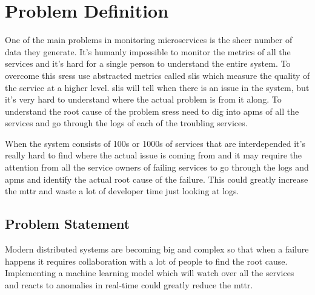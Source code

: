 {\let\clearpage\relax \chapter{Problem Definition}}

One of the main problems in monitoring microservices is the sheer number of data they generate. It's humanly impossible to monitor the metrics of all the services and it's hard for a single person to understand the entire system. To overcome this \acp{sres} use abstracted metrics called \acp{sli} which measure the quality of the service at a higher level. \acp{sli} will tell when there is an issue in the system, but it's very hard to understand where the actual problem is from it along. To understand the root cause of the problem \acp{sres} need to dig into \acp{apm} of all the services and go through the logs of each of the troubling services.

When the system consists of 100s or 1000s of services that are interdepended it's really hard to find where the actual issue is coming from and it may require the attention from all the service owners of failing services to go through the logs and \acp{apm} and identify the actual root cause of the failure.
This could greatly increase the \ac{mttr} and waste a lot of developer time just looking at logs.

\section{Problem Statement}

Modern distributed systems are becoming big and complex so that when a failure happens it requires collaboration with a lot of people to find the root cause.  Implementing a machine learning model which will watch over all the services and reacts to anomalies in real-time could greatly reduce the \ac{mttr}.